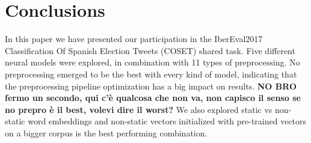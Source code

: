 \section{Conclusions} \label{sec:conclusion}

In this paper we have presented our participation in the IberEval2017 Classification Of Spanish Election Tweets (COSET) shared task. Five different neural models were explored, in combination with 11 types of preprocessing. No preprocessing emerged to be the best with every kind of model, indicating that the preprocessing pipeline optimization has a big impact on results. \textbf{NO BRO fermo un secondo, qui c'è qualcosa che non va, non capisco il senso se no prepro è il best, volevi dire il worst?}
We also explored static vs non-static word embeddings and non-static vectors initialized with pre-trained vectors on a bigger corpus is the best performing combination.


